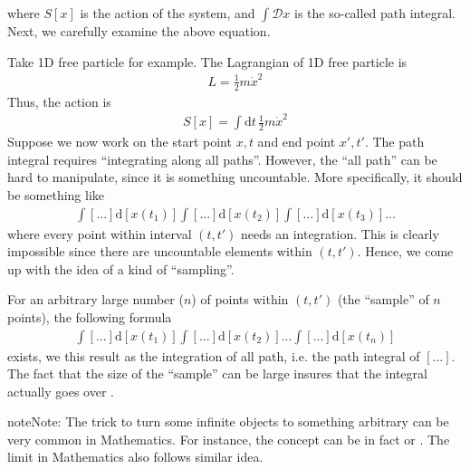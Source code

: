 \documentclass[letterpaper,10pt,english]{sphinxmanual}
\begin{document}
where \(S[x]\) is the action of the system, and \(\int\mathcal{D}x\) is the so-called path integral. Next, we carefully examine the above equation.

Take 1D free particle for example. The Lagrangian of 1D free particle is
\begin{equation*}
\begin{split}L = \frac{1}{2}m\dot{x}^2\end{split}
\end{equation*}
Thus, the action is
\begin{equation*}
\begin{split}S[x] = \int\mathrm{d}t\,\frac{1}{2}m\dot{x}^2\end{split}
\end{equation*}
Suppose we now work on the start point \(x, t\) and end point \(x', t'\). The path integral requires ``integrating along all paths''. However, the ``all path'' can be hard to manipulate, since it is something uncountable. More specifically, it should be something like
\begin{equation*}
\begin{split}\int [...]\mathrm{d}[x(t_1)]\int [...]\mathrm{d}[x(t_2)]\int [...]\mathrm{d}[x(t_3)]...\end{split}
\end{equation*}
where every point within interval \((t,t')\) needs an integration. This is clearly impossible since there are uncountable elements within \((t,t')\). Hence, we come up with the idea of a kind of ``sampling''.

For an arbitrary large number (\(n\)) of points within \((t,t')\) (the ``sample'' of \(n\) points), the following formula
\begin{equation*}
\begin{split}\int [...]\mathrm{d}[x(t_1)] \int [...]\mathrm{d}[x(t_2)] ... \int [...]\mathrm{d}[x(t_n)]\end{split}
\end{equation*}
exists, we  this result as the integration of all path, i.e. the path integral of \([...]\). The fact that the size of the ``sample'' can be  large insures that the integral actually goes over .

\begin{sphinxadmonition}{note}{Note:}
The trick to turn some infinite objects to something arbitrary can be very common in Mathematics. For instance, the concept  can be in fact  or . The limit in Mathematics also follows similar idea.
\end{sphinxadmonition}
\end{document}
